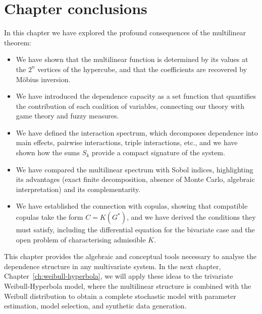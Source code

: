 \section*{Chapter conclusions}

In this chapter we have explored the profound consequences of the multilinear theorem:

\begin{itemize}
    \item We have shown that the multilinear function is determined by its values at the \(2^n\) vertices of the hypercube, and that the coefficients are recovered by Möbius inversion.
    \item We have introduced the dependence capacity as a set function that quantifies the contribution of each coalition of variables, connecting our theory with game theory and fuzzy measures.
    \item We have defined the interaction spectrum, which decomposes dependence into main effects, pairwise interactions, triple interactions, etc., and we have shown how the sums \(S_k\) provide a compact signature of the system.
    \item We have compared the multilinear spectrum with Sobol indices, highlighting its advantages (exact finite decomposition, absence of Monte Carlo, algebraic interpretation) and its complementarity.
    \item We have established the connection with copulas, showing that compatible copulas take the form \(C=K(G^*)\), and we have derived the conditions they must satisfy, including the differential equation for the bivariate case and the open problem of characterising admissible \(K\).
\end{itemize}

This chapter provides the algebraic and conceptual tools necessary to analyse the dependence structure in any multivariate system. In the next chapter, Chapter~\ref{ch:weibull-hyperbola}, we will apply these ideas to the trivariate Weibull-Hyperbola model, where the multilinear structure is combined with the Weibull distribution to obtain a complete stochastic model with parameter estimation, model selection, and synthetic data generation. 